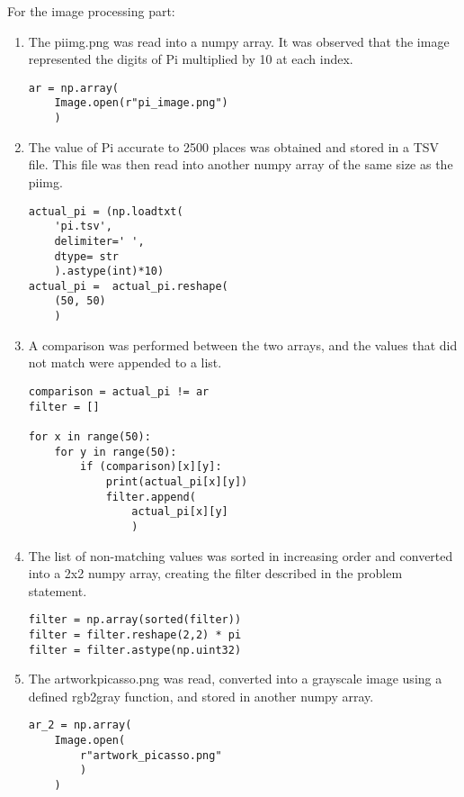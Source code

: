 \documentclass[letterpaper, 10 pt, conference]{IEEEtran}
\begin{document}
For the image processing part:
\begin{enumerate}
\item The pi\textunderscore img.png was read into a numpy array. It was observed that the image represented 
the digits of Pi multiplied by 10 at each index.

\begin{lstlisting}
ar = np.array(
    Image.open(r"pi_image.png")
    )
\end{lstlisting}

\item The value of Pi accurate to 2500 places was obtained and stored in a TSV file. This file was then read 
into another numpy array of the same size as the pi\textunderscore img.
\begin{lstlisting}
actual_pi = (np.loadtxt(
    'pi.tsv', 
    delimiter=' ', 
    dtype= str
    ).astype(int)*10)
actual_pi =  actual_pi.reshape(
    (50, 50)
    )
\end{lstlisting}


\item A comparison was performed between the two arrays, and the values that did not match were appended to 
a list.

\begin{lstlisting}
comparison = actual_pi != ar
filter = []

for x in range(50):
    for y in range(50):
        if (comparison)[x][y]:
            print(actual_pi[x][y])
            filter.append(
                actual_pi[x][y]
                )
\end{lstlisting}

\item The list of non-matching values was sorted in increasing order and converted into a 2x2 numpy array, 
creating the filter described in the problem statement.

\begin{lstlisting}
filter = np.array(sorted(filter))
filter = filter.reshape(2,2) * pi
filter = filter.astype(np.uint32)
\end{lstlisting}

\item The artwork\textunderscore picasso.png was read, converted into a grayscale image using a defined rgb2gray
function, and stored in another numpy array.

\begin{lstlisting}
ar_2 = np.array(
    Image.open(
        r"artwork_picasso.png"
        )
    )
\end{lstlisting}


\end{enumerate}
\end{document}
